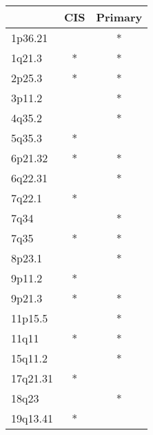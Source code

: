 \begin{tabular}{lcc}
\toprule
{} & CIS & Primary \\
\midrule
1p36.21  &     &       * \\
1q21.3   &   * &       * \\
2p25.3   &   * &       * \\
3p11.2   &     &       * \\
4q35.2   &     &       * \\
5q35.3   &   * &         \\
6p21.32  &   * &       * \\
6q22.31  &     &       * \\
7q22.1   &   * &         \\
7q34     &     &       * \\
7q35     &   * &       * \\
8p23.1   &     &       * \\
9p11.2   &   * &         \\
9p21.3   &   * &       * \\
11p15.5  &     &       * \\
11q11    &   * &       * \\
15q11.2  &     &       * \\
17q21.31 &   * &         \\
18q23    &     &       * \\
19q13.41 &   * &         \\
\bottomrule
\end{tabular}
